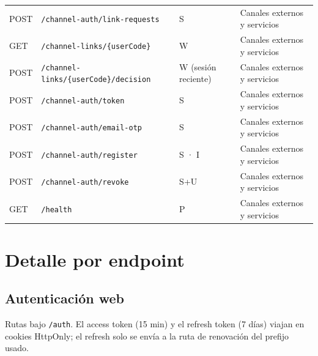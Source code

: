 \documentclass[11pt,a4paper]{report}
\begin{document}
\begin{center}
\begin{longtable}{@{}lp{7.3cm}p{2.8cm}p{3.4cm}@{}}
POST & \texttt{/\allowbreak{}channel-auth/\allowbreak{}link-requests} & S & Canales externos y servicios\\
GET & \texttt{/\allowbreak{}channel-links/\allowbreak{}\{userCode\}} & W & Canales externos y servicios\\
POST & \texttt{/\allowbreak{}channel-links/\allowbreak{}\{userCode\}/\allowbreak{}decision} & W (sesión reciente) & Canales externos y servicios\\
POST & \texttt{/\allowbreak{}channel-auth/\allowbreak{}token} & S & Canales externos y servicios\\
POST & \texttt{/\allowbreak{}channel-auth/\allowbreak{}email-otp} & S & Canales externos y servicios\\
POST & \texttt{/\allowbreak{}channel-auth/\allowbreak{}register} & S · I & Canales externos y servicios\\
POST & \texttt{/\allowbreak{}channel-auth/\allowbreak{}revoke} & S+U & Canales externos y servicios\\
GET & \texttt{/\allowbreak{}health} & P & Canales externos y servicios\\
\bottomrule
\end{longtable}
\end{center}

\section{Detalle por endpoint}
\subsection{Autenticación web}
Rutas bajo \texttt{/\allowbreak{}auth}. El access token (15 min) y el refresh token (7 días) viajan en cookies HttpOnly; el refresh solo se envía a la ruta de renovación del prefijo usado.
\end{document}
